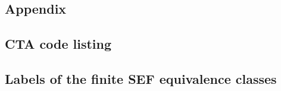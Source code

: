 \clearpage
\printbibliography

\begin{appendices}
  \section{Appendix}

  \subsection{CTA code listing}
  

  \pagebreak
  \subsection{Labels of the finite SEF equivalence classes}
  \begin{figure}[h!]
    \centering
    \begin{subfigure}[b]{0.7\linewidth}

\end{subfigure}
\end{figure}
\end{appendices}

